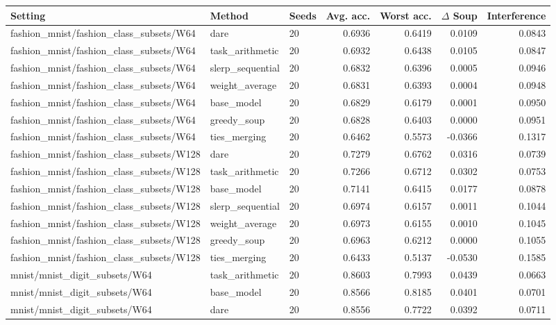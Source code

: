 \begin{tabular}{lllrrrr}
\toprule
Setting & Method & Seeds & Avg. acc. & Worst acc. & $\Delta$ Soup & Interference \\
\midrule
fashion\_mnist/fashion\_class\_subsets/W64 & dare & 20 & 0.6936 & 0.6419 & 0.0109 & 0.0843 \\
fashion\_mnist/fashion\_class\_subsets/W64 & task\_arithmetic & 20 & 0.6932 & 0.6438 & 0.0105 & 0.0847 \\
fashion\_mnist/fashion\_class\_subsets/W64 & slerp\_sequential & 20 & 0.6832 & 0.6396 & 0.0005 & 0.0946 \\
fashion\_mnist/fashion\_class\_subsets/W64 & weight\_average & 20 & 0.6831 & 0.6393 & 0.0004 & 0.0948 \\
fashion\_mnist/fashion\_class\_subsets/W64 & base\_model & 20 & 0.6829 & 0.6179 & 0.0001 & 0.0950 \\
fashion\_mnist/fashion\_class\_subsets/W64 & greedy\_soup & 20 & 0.6828 & 0.6403 & 0.0000 & 0.0951 \\
fashion\_mnist/fashion\_class\_subsets/W64 & ties\_merging & 20 & 0.6462 & 0.5573 & -0.0366 & 0.1317 \\
fashion\_mnist/fashion\_class\_subsets/W128 & dare & 20 & 0.7279 & 0.6762 & 0.0316 & 0.0739 \\
fashion\_mnist/fashion\_class\_subsets/W128 & task\_arithmetic & 20 & 0.7266 & 0.6712 & 0.0302 & 0.0753 \\
fashion\_mnist/fashion\_class\_subsets/W128 & base\_model & 20 & 0.7141 & 0.6415 & 0.0177 & 0.0878 \\
fashion\_mnist/fashion\_class\_subsets/W128 & slerp\_sequential & 20 & 0.6974 & 0.6157 & 0.0011 & 0.1044 \\
fashion\_mnist/fashion\_class\_subsets/W128 & weight\_average & 20 & 0.6973 & 0.6155 & 0.0010 & 0.1045 \\
fashion\_mnist/fashion\_class\_subsets/W128 & greedy\_soup & 20 & 0.6963 & 0.6212 & 0.0000 & 0.1055 \\
fashion\_mnist/fashion\_class\_subsets/W128 & ties\_merging & 20 & 0.6433 & 0.5137 & -0.0530 & 0.1585 \\
mnist/mnist\_digit\_subsets/W64 & task\_arithmetic & 20 & 0.8603 & 0.7993 & 0.0439 & 0.0663 \\
mnist/mnist\_digit\_subsets/W64 & base\_model & 20 & 0.8566 & 0.8185 & 0.0401 & 0.0701 \\
mnist/mnist\_digit\_subsets/W64 & dare & 20 & 0.8556 & 0.7722 & 0.0392 & 0.0711 \\

\end{tabular}
